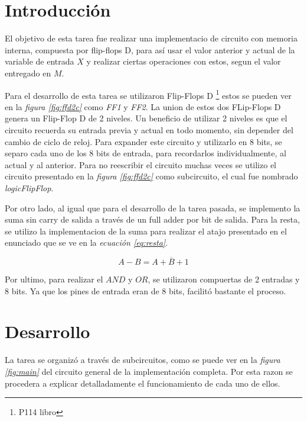 \documentclass[12pt]{article}
\begin{document}
\vspace{0.5cm}

\section{Introducción}

El objetivo de esta tarea fue realizar una implementacio de circuito con memoria interna, compuesta por flip-flops D, para así usar el valor anterior y actual de la variable de entrada $X$ y realizar ciertas operaciones con estos, segun el valor entregado en $M$.

Para el desarrollo de esta tarea se utilizaron Flip-Flops D \footnote{P114 libro} estos se pueden ver en la \textit{figura \ref{fig:ffd2c}} como \textit{FF1} y \textit{FF2}. La union de estos dos FLip-Flops D genera un Flip-Flop D de 2 niveles. Un beneficio de utilizar 2 niveles es que el circuito recuerda su entrada previa y actual en todo momento, sin depender del cambio de ciclo de reloj. Para expander este circuito y utilizarlo en 8 bits, se separo cada uno de los 8 bits de entrada, para recordarlos individualmente, al actual y al anterior. Para no reescribir el circuito muchas veces se utilizo el circuito presentado en la \textit{figura \ref{fig:ffd2c}} como subcircuito, el cual fue nombrado \textit{logicFlipFlop}.

Por otro lado, al igual que para el desarrollo de la tarea pasada, se implemento la suma sin carry de salida a través de un full adder por bit de salida. Para la resta, se utilizo la implementacion de la suma para realizar el atajo presentado en el enunciado que se ve en la \textit{ecuación \ref{eq:resta}}.

\begin{equation}\label{eq:resta}
A - B = A + \overline{B} + 1
\end{equation}

Por ultimo, para realizar el $AND$ y $OR$, se utilizaron compuertas de 2 entradas y 8 bits. Ya que los pines de entrada eran de 8 bits, facilitó bastante el proceso.

\section{Desarrollo}
La tarea se organizó a través de subcircuitos, como se puede ver en la \textit{figura \ref{fig:main}} del circuito general de la implementación completa. Por esta razon se procedera a explicar detalladamente el funcionamiento de cada uno de ellos.
\end{document}

